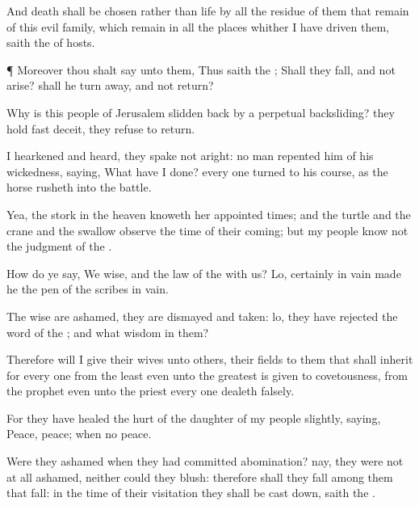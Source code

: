 {And
death shall be
chosen rather than
life by all the
residue of them that
remain of this
evil
family, which
remain in all the
places whither I have
driven them,
saith the
{} of
hosts.


\par }{\PP {}¶ Moreover thou shalt
say unto them, Thus
saith the
{}; Shall they
fall, and not
arise? shall he turn
away, and not
return?

Why
{} is this
people of
Jerusalem slidden
back by a
perpetual
backsliding? they
hold fast
deceit, they
refuse to
return.

I
hearkened and
heard,
{} they spake not
aright: no
man
repented him
of his
wickedness,
saying, What have I
done? every one
turned to his
course, as the
horse
rusheth into the
battle.

Yea, the
stork in the
heaven
knoweth her appointed
times; and the
turtle and the
crane and the
swallow
observe the
time of their
coming; but my
people
know not the
judgment of the
{}.

How do ye
say, We
{}
wise, and the
law of the
{}
{} with us? Lo,
certainly in
vain
made he
{} the
pen of the
scribes
{} in
vain.

The
wise
{} are
ashamed, they are
dismayed and
taken: lo, they have
rejected the
word of the
{}; and what
wisdom
{} in them?

Therefore will I
give their
wives unto
others,
{} their
fields to them that shall
inherit
{} for every one from the
least even unto the
greatest is
given to
covetousness, from the
prophet even unto the
priest every one
dealeth
falsely.

For they have
healed the
hurt of the
daughter of my
people
slightly,
saying,
Peace,
peace; when
{} no
peace.

Were they
ashamed when they had
committed
abomination? nay, they were not at
all
ashamed, neither
could they
blush: therefore shall they
fall among them that
fall: in the
time of their
visitation they shall be cast
down,
saith the
{}.


}
